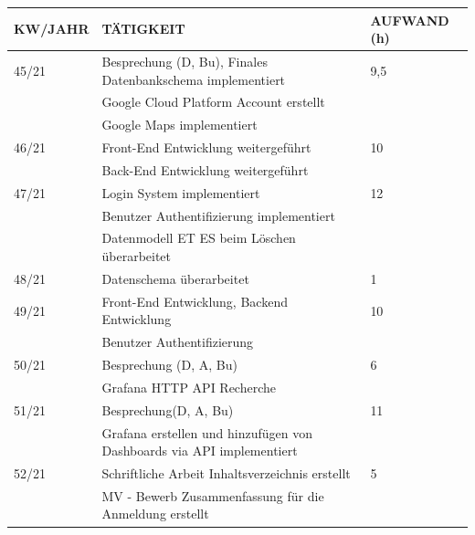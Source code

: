 \newpage
\begin{table}[h]
	\begin{tabular}{|l|l|l|}
		\hline
		\textbf{KW/JAHR} &     \textbf{TÄTIGKEIT}  & 	\textbf{AUFWAND (h)}    \\ \hline
		
		45/21   & Besprechung (D, Bu), Finales Datenbankschema implementiert & 9,5	\\ 
		
		& Google Cloud Platform Account erstellt & \\
		& Google Maps implementiert & \\ \hline
		
		
		
		
		46/21   & Front-End Entwicklung weitergeführt  & 10 	\\
		& Back-End Entwicklung weitergeführt& \\ \hline
		
		
		
		
		47/21   & Login System implementiert  & 12 	\\
			& Benutzer Authentifizierung implementiert & \\ 
			& Datenmodell ET ES beim Löschen überarbeitet & \\ \hline
		
		
		
		
		
		48/21   & Datenschema überarbeitet& 1	\\ \hline
		
		
		49/21   & Front-End Entwicklung, Backend Entwicklung & 10 \\ 
		
	& Benutzer Authentifizierung & \\ 	\hline
		
		
		
		
		
		
		
		50/21   & Besprechung (D, A, Bu) & 6   \\
		& Grafana HTTP API Recherche & \\ \hline	
		
		
		
		51/21   & Besprechung(D, A, Bu)  & 11 \\
		& Grafana erstellen und hinzufügen von Dashboards via API implementiert & 	\\ \hline		
		
		
		52/21   & Schriftliche Arbeit Inhaltsverzeichnis erstellt  & 5 \\ 
		& MV - Bewerb Zusammenfassung für die Anmeldung erstellt & \\	\hline		
		

\end{tabular}
\end{table}
